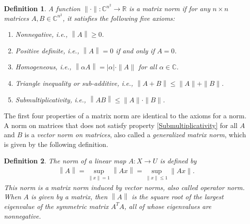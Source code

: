 \documentclass[10pt]{book}
\newtheorem{definition}{Definition}[chapter]
\theoremstyle{definition}
\numberwithin{equation}{chapter}
\begin{document}
\begin{definition}{\rm \cite{39}}\label{matrix_norm_def}
A function $\|\cdot \|: \mathbb{C}^{n^2} \to \mathbb{R}$ is a matrix norm if for any $n \times n$ matrices $A, B \in \mathbb{C}^{n^2}$, it satisfies the following five axioms:
\begin{enumerate}[label=(\arabic*)]
    \item Nonnegative, i.e., $\left\|A\right\| \geq 0$.
    
    \item Positive definite, i.e., $\left\|A\right\| = 0$ if and only if $A = 0$.
    
    \item Homogeneous, i.e., $\left\|\alpha A\right\|= |\alpha| \cdot \|A\|$ for all $\alpha \in \mathbb{C}$.
    
    \item Triangle inequality or sub-additive, i.e., $\left\|A + B\right\| \leq \|A\| + \|B\|$.
    
    \item Submultiplicativity, i.e., $\left\|A B\right\| \leq \|A\| \cdot \|B\|$. \label{Submultiplicativity}
\end{enumerate}
\end{definition}

The first four properties of a matrix norm are identical to the axioms for a norm. A norm on matrices that does not
satisfy property \ref{Submultiplicativity} for all $A$ and $B$ is a {\em vector norm on matrices}, also called a {\em generalized matrix norm}, which is given by the following definition.

\medskip

\begin{definition}\label{vector_norm_matrix_def}
The norm of a linear map $A:X\to U$ is defined by
\begin{align*}
    \left\|A\right\| = \sup_{\|x\| = 1} \left\|Ax\right\| = \sup_{\|x\| \leq 1} \|Ax\|.
\end{align*}
This norm is a matrix norm induced by vector norms, also called operator norm. When $A$ is given by a matrix, then $\left\|A\right\|$ is the square root of the largest eigenvalue of the symmetric matrix $A^TA$, all of whose eigenvalues are nonnegative.
\end{definition}

\medskip
\end{document}
